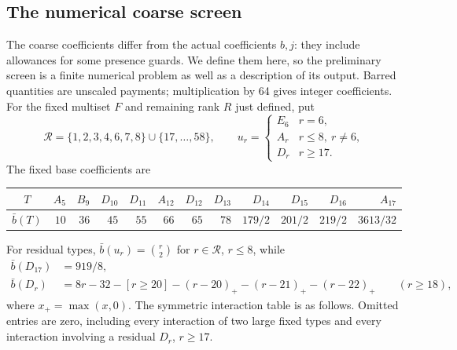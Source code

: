 \subsection{The numerical coarse screen}\label{app:coarse-screen}

The coarse coefficients differ from the actual coefficients $b,j$:
they include allowances for some presence guards. We define them here,
so the preliminary screen is a finite numerical problem as well as a
description of its output. Barred quantities are unscaled payments;
multiplication by 64 gives integer coefficients.
For the fixed multiset $F$ and remaining rank $R$ just defined, put
\[
 \mathcal R=\{1,2,3,4,6,7,8\}\cup\{17,\ldots,58\},\qquad
 u_r=\begin{cases}E_6&r=6,\\ A_r&r\le8,\ r\ne6,\\D_r&r\ge17.
 \end{cases}
\]
The fixed base coefficients are
\begin{center}
\begingroup\small\setlength{\tabcolsep}{3pt}
\begin{tabular}{c*{11}{r}}
\toprule
$T$&$A_5$&$B_9$&$D_{10}$&$D_{11}$&$A_{12}$&$D_{12}$&$D_{13}$&$D_{14}$&$D_{15}$&$D_{16}$&$A_{17}$\\
\midrule
$\bar b(T)$&$10$&$36$&$45$&$55$&$66$&$65$&$78$&$179/2$&$201/2$&$219/2$&$3613/32$\\
\bottomrule
\end{tabular}
\endgroup
\end{center}
For residual types, $\bar b(u_r)=\binom r2$ for $r\in\mathcal R$, $r\le8$,
while
\begin{align*}
 \bar b(D_{17})&=919/8,\\
 \bar b(D_r)&=8r-32-[r\ge20]
       -(r-20)_+-(r-21)_+-(r-22)_+\qquad(r\ge18),
\end{align*}
where $x_+=\max(x,0)$. The symmetric interaction table is as follows.
Omitted entries are zero, including every interaction of two large fixed
types and every interaction involving a residual $D_r$, $r\ge17$.
